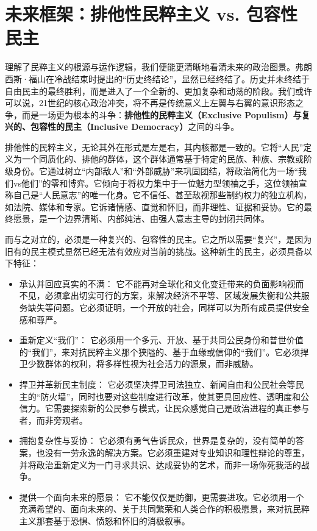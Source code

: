 \section{未来框架：排他性民粹主义 vs. 包容性民主}

理解了民粹主义的根源与运作逻辑，我们便能更清晰地看清未来的政治图景。弗朗西斯·福山在冷战结束时提出的“历史终结论”，显然已经终结了。历史并未终结于自由民主的最终胜利，而是进入了一个全新的、更加复杂和动荡的阶段。我们或许可以说，21世纪的核心政治冲突，将不再是传统意义上左翼与右翼的意识形态之争，而是一场更为根本的斗争：\textbf{排他性的民粹主义（Exclusive Populism）与复兴的、包容性的民主（Inclusive Democracy）}之间的斗争。

排他性的民粹主义，无论其外在形式是左是右，其内核都是一致的。它将“人民”定义为一个同质化的、排他的群体，这个群体通常基于特定的民族、种族、宗教或阶级身份。它通过树立“内部敌人”和“外部威胁”来巩固团结，将政治简化为一场“我们vs他们”的零和博弈。它倾向于将权力集中于一位魅力型领袖之手，这位领袖宣称自己是“人民意志”的唯一化身。它不信任、甚至敌视那些制约权力的独立机构，如法院、媒体和专家。它诉诸情感、直觉和怀旧，而非理性、证据和妥协。它的最终愿景，是一个边界清晰、内部纯洁、由强人意志主导的封闭共同体。

而与之对立的，必须是一种复兴的、包容性的民主。它之所以需要“复兴”，是因为旧有的民主模式显然已经无法有效应对当前的挑战。这种新生的民主，必须具备以下特征：
\begin{itemize}
    \item 承认并回应真实的不满： 它不能再对全球化和文化变迁带来的负面影响视而不见，必须拿出切实可行的方案，来解决经济不平等、区域发展失衡和公共服务缺失等问题。它必须证明，一个开放的社会，同样可以为所有成员提供安全感和尊严。
    \item 重新定义“我们”： 它必须用一个多元、开放、基于共同公民身份和普世价值的“我们”，来对抗民粹主义那个狭隘的、基于血缘或信仰的“我们”。它必须捍卫少数群体的权利，将多样性视为社会活力的源泉，而非威胁。
    \item 捍卫并革新民主制度： 它必须坚决捍卫司法独立、新闻自由和公民社会等民主的“防火墙”，同时也要对这些制度进行改革，使其更具回应性、透明度和公信力。它需要探索新的公民参与模式，让民众感觉自己是政治进程的真正参与者，而非旁观者。
    \item 拥抱复杂性与妥协： 它必须有勇气告诉民众，世界是复杂的，没有简单的答案，也没有一劳永逸的解决方案。它必须重建对专业知识和理性辩论的尊重，并将政治重新定义为一门寻求共识、达成妥协的艺术，而非一场你死我活的战争。
    \item 提供一个面向未来的愿景： 它不能仅仅是防御，更需要进攻。它必须用一个充满希望的、面向未来的、关于共同繁荣和人类合作的积极愿景，来对抗民粹主义那套基于恐惧、愤怒和怀旧的消极叙事。
\end{itemize}

